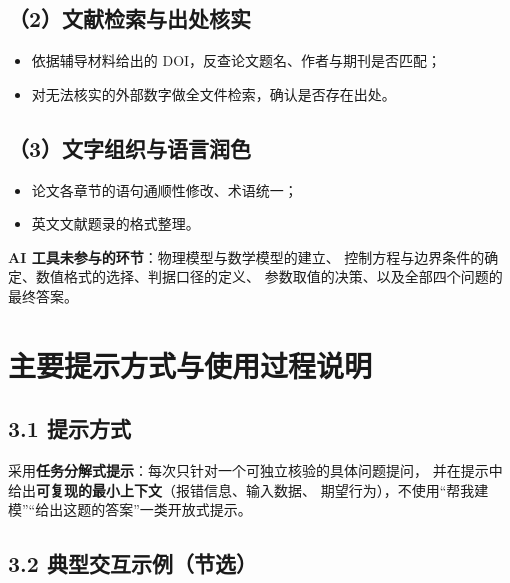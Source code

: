\documentclass[UTF8, a4paper, 11pt, fontset=windows]{ctexart}
\begin{document}
\subsection*{（2）文献检索与出处核实}

\begin{itemize}[leftmargin=1.6em, itemsep=2pt]
  \item 依据辅导材料给出的 DOI，反查论文题名、作者与期刊是否匹配；
  \item 对无法核实的外部数字做全文件检索，确认是否存在出处。
\end{itemize}

\subsection*{（3）文字组织与语言润色}

\begin{itemize}[leftmargin=1.6em, itemsep=2pt]
  \item 论文各章节的语句通顺性修改、术语统一；
  \item 英文文献题录的格式整理。
\end{itemize}

\noindent\textbf{AI 工具未参与的环节}：物理模型与数学模型的建立、
控制方程与边界条件的确定、数值格式的选择、判据口径的定义、
参数取值的决策、以及全部四个问题的最终答案。

\section{主要提示方式与使用过程说明}

\subsection*{3.1 提示方式}

采用\textbf{任务分解式提示}：每次只针对一个可独立核验的具体问题提问，
并在提示中给出\textbf{可复现的最小上下文}（报错信息、输入数据、
期望行为），不使用``帮我建模''``给出这题的答案''一类开放式提示。

\subsection*{3.2 典型交互示例（节选）}
\end{document}
